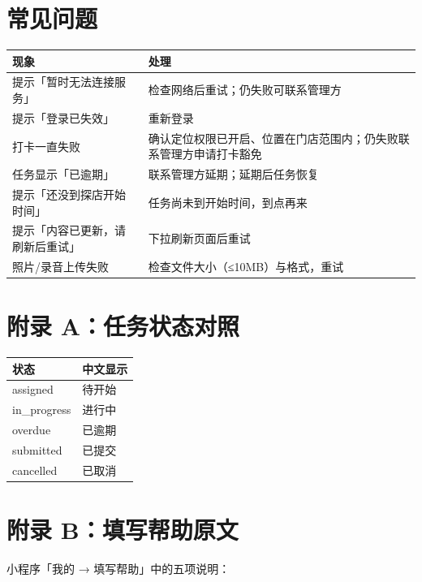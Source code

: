 \documentclass[12pt,a4paper,fontset=none]{ctexart}
\begin{document}
\section{常见问题}

\begin{center}
\begin{tabular}{p{5.4cm}p{8cm}}
\toprule
现象 & 处理 \\
\midrule
提示「暂时无法连接服务」 & 检查网络后重试；仍失败可联系管理方 \\
提示「登录已失效」 & 重新登录 \\
打卡一直失败 & 确认定位权限已开启、位置在门店范围内；仍失败联系管理方申请打卡豁免 \\
任务显示「已逾期」 & 联系管理方延期；延期后任务恢复 \\
提示「还没到探店开始时间」 & 任务尚未到开始时间，到点再来 \\
提示「内容已更新，请刷新后重试」 & 下拉刷新页面后重试 \\
照片/录音上传失败 & 检查文件大小（≤10MB）与格式，重试 \\
\bottomrule
\end{tabular}
\end{center}

\appendix

\section{附录 A：任务状态对照}

\begin{center}
\begin{tabular}{ll}
\toprule
状态 & 中文显示 \\
\midrule
assigned & 待开始 \\
in\_progress & 进行中 \\
overdue & 已逾期 \\
submitted & 已提交 \\
cancelled & 已取消 \\
\bottomrule
\end{tabular}
\end{center}

\section{附录 B：填写帮助原文}

小程序「我的 → 填写帮助」中的五项说明：
\end{document}
